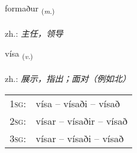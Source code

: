 \documentclass[frontgrid, backgrid]{flacards}\usepackage[]{graphicx}\usepackage[]{xcolor}
\begin{document}
\renewcommand{\flhead}{\vskip5pt \fboxsep=0pt {\small\bfseries\footnotesize Nafnorð | 名词}}
\renewcommand{\fcfoot}{\vskip5pt \fboxsep=0pt \hspace{2pt}{\small\bfseries\footnotesize 1K}}

\renewcommand{\blhead}{\vskip5pt {\small\bfseries\footnotesize Nafnorð | 名词 }}
\renewcommand{\bcfoot}{\vskip5pt \hspace{2pt}{\small\bfseries\footnotesize 1K}}


{formaður \small{\textsubscript{(\textit{m.})}} \\[1ex] %
\textphonetic{[fɔrmaðʏr]} \\
zh.: \emph{主任，领导} \\  [2ex]
\renewcommand*{\arraystretch}{0.8}
}

\renewcommand{\flhead}{\vskip5pt \fboxsep=0pt {\small\bfseries\footnotesize Sagnorð | 动词}}
\renewcommand{\fcfoot}{\vskip5pt \fboxsep=0pt \hspace{2pt}{\small\bfseries\footnotesize 1K}}

\renewcommand{\blhead}{\vskip5pt {\small\bfseries\footnotesize Sagnorð | 动词 }}
\renewcommand{\bcfoot}{\vskip5pt \hspace{2pt}{\small\bfseries\footnotesize 1K}}


{vísa \small{\textsubscript{(\textit{v.})}} \\[1ex] %
\textphonetic{[viːsa]} \\
zh.: \emph{展示，指出；面对（例如北）} \\  [2ex]
\renewcommand*{\arraystretch}{0.8}
\begin{tabular}{p{1cm}l}
\textsc{1sg}: & vísa -- vísaði -- vísað \\ 
\textsc{2sg}: & vísar -- vísaðir -- vísað \\ 
\textsc{3sg}: & vísar -- vísaði -- vísað \\ 
\end{tabular}
}
\end{document}

